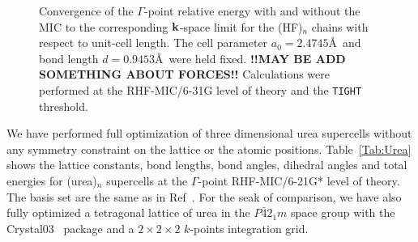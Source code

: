 \documentclass[prl,twocolumn,showpacs,twocolumngrid,superbib]{revtex4}
\begin{document}
\begin{figure}[h]
  \caption{Convergence of the $\Gamma$-point relative energy with and without the MIC to the corresponding 
    ${\bf k}$-space limit for the (HF)$_n$ chains with respect to unit-cell length. The cell parameter 
    $a_0=2.4745$\AA~and bond length $d=0.9453$\AA~were held fixed. 
    {\bf !!MAY BE ADD SOMETHING ABOUT FORCES!!}
    Calculations were performed at the RHF-MIC/6-31G level of theory and the {\tt TIGHT} threshold.}\label{Fig:CnvgEnergy}
\end{figure}


We have performed full optimization of three dimensional urea supercells 
without any symmetry constraint on the lattice or the atomic positions.
Table~\ref{Tab:Urea} shows the lattice constants, bond lengths, 
bond angles, dihedral angles and total energies
for (urea)$_n$ supercells at the $\Gamma$-point RHF-MIC/6-21G* level of
theory. The basis set are the same as in Ref~\cite{RDovesi90}.
For the seak of comparison, we have also fully optimized a tetragonal lattice
of urea in the $P\bar{4}2_1m$ space group with the 
{\sc Crystal03}~\cite{Crystal03} package and a $2\times 2\times 2$ $k$-points 
integration grid.
\end{document}
